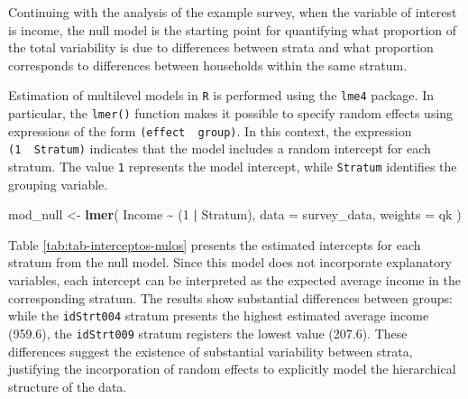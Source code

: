 \documentclass[
  english,
  12pt,
]{book}
\newenvironment{Shaded}{\begin{snugshade}}{\end{snugshade}}
\newcommand{\AttributeTok}[1]{\textcolor[rgb]{0.13,0.29,0.53}{#1}}
\newcommand{\DataTypeTok}[1]{\textcolor[rgb]{0.13,0.29,0.53}{#1}}
\newcommand{\DecValTok}[1]{\textcolor[rgb]{0.00,0.00,0.81}{#1}}
\newcommand{\FunctionTok}[1]{\textcolor[rgb]{0.13,0.29,0.53}{\textbf{#1}}}
\newcommand{\NormalTok}[1]{#1}
\newcommand{\OtherTok}[1]{\textcolor[rgb]{0.56,0.35,0.01}{#1}}
\newcommand{\SpecialCharTok}[1]{\textcolor[rgb]{0.81,0.36,0.00}{\textbf{#1}}}
\begin{document}
Continuing with the analysis of the example survey, when the variable of interest is income, the null model is the starting point for quantifying what proportion of the total variability is due to differences between strata and what proportion corresponds to differences between households within the same stratum.

Estimation of multilevel models in \texttt{R} is performed using the \texttt{lme4} \citep{lme42026} package. In particular, the \texttt{lmer()} function makes it possible to specify random effects using expressions of the form \texttt{(effect\ \textbar{}\ group)}. In this context, the expression \texttt{(1\ \textbar{}\ Stratum)} indicates that the model includes a random intercept for each stratum. The value \texttt{1} represents the model intercept, while \texttt{Stratum} identifies the grouping variable.

\begin{Shaded}
\begin{Highlighting}[]
\NormalTok{mod\_null }\OtherTok{\textless{}{-}} \FunctionTok{lmer}\NormalTok{(}
\NormalTok{  Income }\SpecialCharTok{\textasciitilde{}}\NormalTok{ (}\DecValTok{1} \SpecialCharTok{|}\NormalTok{ Stratum),}
  \AttributeTok{data =}\NormalTok{ survey\_data,}
  \AttributeTok{weights =}\NormalTok{ qk}
\NormalTok{)}
\end{Highlighting}
\end{Shaded}

Table \ref{tab:tab-interceptos-nulos} presents the estimated intercepts for each stratum from the null model. Since this model does not incorporate explanatory variables, each intercept can be interpreted as the expected average income in the corresponding stratum. The results show substantial differences between groups: while the \texttt{idStrt004} stratum presents the highest estimated average income (959.6), the \texttt{idStrt009} stratum registers the lowest value (207.6). These differences suggest the existence of substantial variability between strata, justifying the incorporation of random effects to explicitly model the hierarchical structure of the data.

\begin{Shaded}
\end{Shaded}
\end{document}
